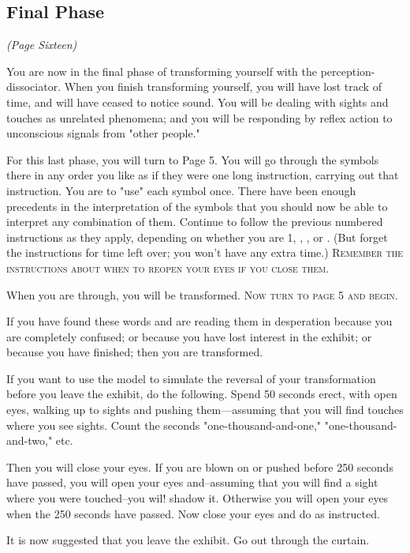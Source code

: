 \documentclass[10pt,twoside,draft]{memoir}
\begin{document}
{{\clearpage

\subsection*{Final Phase}
\emph{(Page Sixteen)}

You are now in the final phase of transforming yourself with the 
perception-dissociator. When you finish transforming yourself, you will have 
lost track of time, and will have ceased to notice sound. You will be dealing 
with sights and touches as unrelated phenomena; and you will be responding 
by reflex action to unconscious signals from "other people." 

For this last phase, you will turn to Page 5. You will go through the 
symbols there in any order you like as if they were one long instruction, 
carrying out that instruction. You are to "use" each symbol once. There 
have been enough precedents in the interpretation of the symbols that you 
should now be able to interpret any combination of them. Continue to 
follow the previous numbered instructions as they apply, depending on 
whether you are 1, , , or . 
(But forget the instructions for time left 
over; you won't have any extra time.) 
\textsc{Remember the instructions about when to reopen your eyes if you close them.}

When you are through, you will be transformed. 
\textsc{Now turn to page 5 and begin.}

\clearpage

If you have found these words and are reading them in desperation 
because you are completely confused; or because you have lost interest in 
the exhibit; or because you have finished; then you are transformed. 


If you want to use the model to simulate the reversal of your 
transformation before you leave the exhibit, do the following. Spend 50 
seconds erect, with open eyes, walking up to sights and pushing 
them---assuming that you will find touches where you see sights. Count the 
seconds "one-thousand-and-one," "one-thousand-and-two," etc. 


Then you will close your eyes. If you are blown on or pushed before 
250 seconds have passed, you will open your eyes and--assuming that you 
will find a sight where you were touched--you wil! shadow it. Otherwise you 
will open your eyes when the 250 seconds have passed. Now close your eyes 
and do as instructed. 


It is now suggested that you leave the exhibit. Go out through the 
curtain. 

}}
\end{document}
